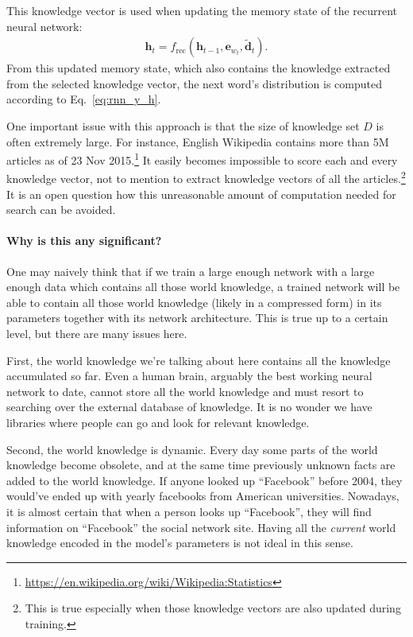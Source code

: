 \documentclass{report}
\newcommand{\vect}[1]{\mathbf{#1}}
\newcommand{\ve}[0]{\vect{e}}
\newcommand{\vh}[0]{\vect{h}}
\newcommand{\vd}[0]{\vect{d}}
\begin{document}
This knowledge vector is used when updating the memory state of the recurrent
neural network:
\begin{align*}
    \vh_t = f_{\text{rec}}\left( \vh_{t-1}, \ve_{w_t}, \tilde{\vd}_t \right).
\end{align*}
From this updated memory state, which also contains the knowledge extracted from
the selected knowledge vector, the next word's distribution is computed
according to Eq.~\eqref{eq:rnn_y_h}.

One important issue with this approach is that the size of knowledge set $D$ is
often extremely large. For instance, English Wikipedia contains more than 5M
articles as of 23 Nov 2015.\footnote{
    \url{https://en.wikipedia.org/wiki/Wikipedia:Statistics}
} It easily becomes impossible to score each and every knowledge vector, not to
mention to extract knowledge vectors of all the articles.\footnote{
    This is true especially when those knowledge vectors are also updated during
    training.
} It is an open question how this unreasonable amount of computation needed for
search can be avoided.

\paragraph{Why is this any significant?}

One may naively think that if we train a large enough network with a large
enough data which contains all those world knowledge, a trained network will be
able to contain all those world knowledge (likely in a compressed form) in its
parameters together with its network architecture. This is true up to a certain
level, but there are many issues here. 

First, the world knowledge we're talking about here contains all the knowledge
accumulated so far. Even a human brain, arguably the best working neural network
to date, cannot store all the world knowledge and must resort to searching over
the external database of knowledge. It is no wonder we have libraries where
people can go and look for relevant knowledge. 

Second, the world knowledge is dynamic. Every day some parts of the world
knowledge become obsolete, and at the same time previously unknown facts are
added to the world knowledge. If anyone looked up ``Facebook'' before 2004, they
would've ended up with yearly facebooks from American universities. Nowadays, it
is almost certain that when a person looks up ``Facebook'', they will find
information on ``Facebook'' the social network site. Having all the {\em
current} world knowledge encoded in the model's parameters is not ideal in this
sense. 
\end{document}
